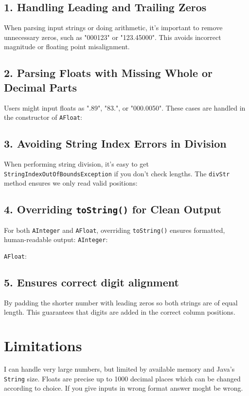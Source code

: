 \documentclass[11pt]{article}
\begin{document}
\subsection*{1. Handling Leading and Trailing Zeros}
When parsing input strings or doing arithmetic, it's important to remove unnecessary zeros, such as "000123" or "123.45000". This avoids incorrect magnitude or floating point misalignment.



\subsection*{2. Parsing Floats with Missing Whole or Decimal Parts}
Users might input floats as ".89", "83.", or "000.0050". These cases are handled in the constructor of \texttt{AFloat}:


\subsection*{3. Avoiding String Index Errors in Division}
When performing string division, it’s easy to get \texttt{StringIndexOutOfBoundsException} if you don’t check lengths. The \texttt{divStr} method ensures we only read valid positions:

\subsection*{4. Overriding \texttt{toString()} for Clean Output}
For both \texttt{AInteger} and \texttt{AFloat}, overriding \texttt{toString()} ensures formatted, human-readable output:
\texttt{AInteger}:

\texttt{AFloat}:
\subsection*{5. Ensures correct digit alignment} By padding the shorter number with leading zeros so both strings are of equal length. This guarantees that digits are added in the correct column positions.



\section{Limitations}
I can handle very large numbers, but limited by available memory and Java's \texttt{String} size. Floats are precise up to 1000 decimal places which can be changed according to choice. If you give inputs in wrong format answer moght be wrong.
\end{document}
